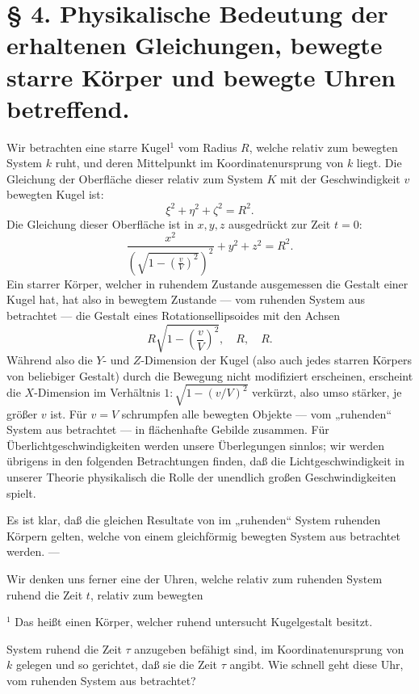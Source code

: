 \documentclass[17pt]{webarticle}       %
\begin{document}
\section*{§ 4. Physikalische Bedeutung der erhaltenen Gleichungen, bewegte starre Körper und bewegte Uhren betreffend.}

Wir betrachten eine starre Kugel\(^1\) vom Radius \( R \), welche relativ zum bewegten System \( k \) ruht, und deren Mittelpunkt im Koordinatenursprung von \( k \) liegt. Die Gleichung der Oberfläche dieser relativ zum System \( K \) mit der Geschwindigkeit \( v \) bewegten Kugel ist:
\[
\xi^2 + \eta^2 + \zeta^2 = R^2.
\]
Die Gleichung dieser Oberfläche ist in \( x, y, z \) ausgedrückt zur Zeit \( t = 0 \):
\[
\frac{x^2}{\left( \sqrt{1 - \left( \frac{v}{V} \right)^2} \right)^2} + y^2 + z^2 = R^2.
\]
Ein starrer Körper, welcher in ruhendem Zustande ausgemessen die Gestalt einer Kugel hat, hat also in bewegtem Zustande — vom ruhenden System aus betrachtet — die Gestalt eines Rotationsellipsoides mit den Achsen
\[
R \sqrt{1 - \left( \frac{v}{V} \right)^2}, \quad R, \quad R.
\]
Während also die \( Y \)- und \( Z \)-Dimension der Kugel (also auch jedes starren Körpers von beliebiger Gestalt) durch die Bewegung nicht modifiziert erscheinen, erscheint die \( X \)-Dimension im Verhältnis \( 1 : \sqrt{1 - (v/V)^2} \) verkürzt, also umso stärker, je größer \( v \) ist. Für \( v = V \) schrumpfen alle bewegten Objekte — vom „ruhenden“ System aus betrachtet — in flächenhafte Gebilde zusammen. Für Überlichtgeschwindigkeiten werden unsere Überlegungen sinnlos; wir werden übrigens in den folgenden Betrachtungen finden, daß die Lichtgeschwindigkeit in unserer Theorie physikalisch die Rolle der unendlich großen Geschwindigkeiten spielt.

Es ist klar, daß die gleichen Resultate von im „ruhenden“ System ruhenden Körpern gelten, welche von einem gleichförmig bewegten System aus betrachtet werden. — 

Wir denken uns ferner eine der Uhren, welche relativ zum ruhenden System ruhend die Zeit \( t \), relativ zum bewegten
\begin{flushleft}
\footnotesize\(^1\) Das heißt einen Körper, welcher ruhend untersucht Kugelgestalt besitzt.
\end{flushleft}




System ruhend die Zeit \( \tau \) anzugeben befähigt sind, im Koordinatenursprung von \( k \) gelegen und so gerichtet, daß sie die Zeit \( \tau \) angibt. Wie schnell geht diese Uhr, vom ruhenden System aus betrachtet?
\end{document}

